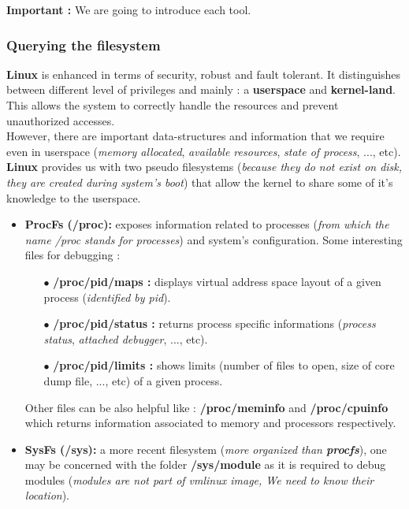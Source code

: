  
 
    
\textbf{\color{red}Important : } We are going to introduce each tool.
\subsubsection{Querying the filesystem}
\textbf{Linux} is enhanced in terms of security, robust and fault tolerant. It distinguishes between different level of privileges
and mainly : a \textbf{userspace} and \textbf{kernel-land}. This allows the system to correctly handle the resources and prevent unauthorized accesses.\\

However, there are important data-structures and information that we require even in userspace (\emph{memory allocated}, \emph{available resources}, \emph{state of process}, ..., etc). \textbf{Linux} provides us with two pseudo filesystems (\textit{because they do not exist on disk, they are created during system's boot}) that allow the kernel to share some of it's knowledge to the userspace.    

\begin{itemize}
	\item \textbf{ProcFs (/proc): } exposes information related to processes (\emph{from which the name /proc stands for processes}) and system's configuration. Some interesting files for debugging :
		\begin{itemize}
			\item[$\bullet$] \textbf{/proc/pid/maps : } displays virtual address space layout of a given process (\textit{identified by pid}).
			\item[$\bullet$] \textbf{/proc/pid/status : } returns process specific informations (\emph{process status}, \emph{{\color{red}attached debugger}}, ..., etc).
			\item[$\bullet$] \textbf{/proc/pid/limits : }	shows limits (number of files to open, size of core dump file, ..., etc) of a given process.					
		\end{itemize}
Other files can be also helpful like : \textbf{/proc/meminfo} and \textbf{/proc/cpuinfo} which returns information associated to memory and processors respectively.	
	\item \textbf{SysFs (/sys): } a more recent filesystem (\emph{more organized than \textbf{procfs}}), one may be concerned with the folder \textbf{/sys/module} as it is required to debug modules (\textit{modules are not part of vmlinux image, We need to know their location}). 
	
	
\end{itemize}

